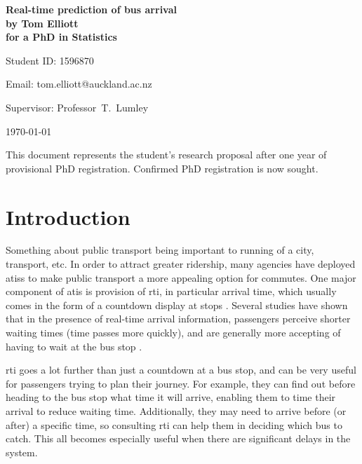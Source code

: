 \documentclass[12pt,a4paper]{article}
\begin{document}
\begin{Large}
\begin{center}
\textbf{Real-time prediction of bus arrival} \\
\textbf{by Tom Elliott} \\
\textbf{for a PhD in Statistics}
\end{center}
\end{Large}


\hfill{Student ID: 1596870}

\hfill{Email: tom.elliott@auckland.ac.nz}

Supervisor: Professor~T.~Lumley





\begin{center}
\today
\end{center}


This document represents the student's research proposal after
one year of provisional PhD registration.
Confirmed PhD registration is now sought.




\section{Introduction}
\label{sec:intro}

Something about public transport being important to running of a city, transport, etc.
In order to attract greater ridership, many agencies have deployed \glspl{atis}
to make public transport a more appealing option for commutes.
One major component of \gls{atis} is provision of \gls{rti},
in particular arrival time,
which usually comes in the form of a countdown display at stops
\citep{cn}.
Several studies have shown that in the presence of real-time arrival information,
passengers perceive shorter waiting times (time passes more quickly),
and are generally more accepting of having to wait at the bus stop
\citep{tcrp:2003}.


\gls{rti} goes a lot further than just a countdown at a bus stop,
and can be very useful for passengers trying to plan their journey.
For example, they can find out before heading to the bus stop what time it will arrive,
enabling them to time their arrival to reduce waiting time.
Additionally, they may need to arrive before (or after) a specific time,
so consulting \gls{rti} can help them in deciding which bus to catch.
This all becomes especially useful when there are significant delays in the system.
\end{document}
